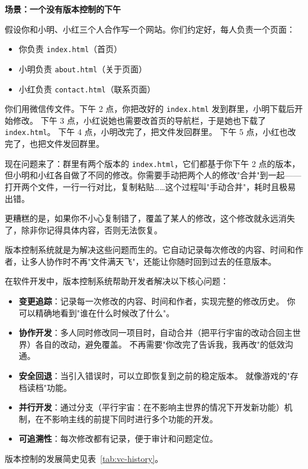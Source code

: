 \documentclass[12pt,a4paper,openany]{ctexbook}
\begin{document}
\medskip
\textbf{场景：一个没有版本控制的下午}

假设你和小明、小红三个人合作写一个网站。你们约定好，每人负责一个页面：
\begin{itemize}
  \item 你负责 \texttt{index.html}（首页）
  \item 小明负责 \texttt{about.html}（关于页面）
  \item 小红负责 \texttt{contact.html}（联系页面）
\end{itemize}

你们用微信传文件。下午 2 点，你把改好的 \texttt{index.html} 发到群里，小明下载后开始修改。
下午 3 点，小红说她也需要改首页的导航栏，于是她也下载了 \texttt{index.html}。
下午 4 点，小明改完了，把文件发回群里。
下午 5 点，小红也改完了，也把文件发回群里。

现在问题来了：群里有两个版本的 \texttt{index.html}，它们都基于你下午 2 点的版本，但小明和小红各自做了不同的修改。你需要手动把两个人的修改"合并"到一起——打开两个文件，一行一行对比，复制粘贴……这个过程叫"手动合并"，耗时且极易出错。

更糟糕的是，如果你不小心复制错了，覆盖了某人的修改，这个修改就永远消失了，除非你记得具体内容，否则无法恢复。

版本控制系统就是为解决这些问题而生的。它自动记录每次修改的内容、时间和作者，让多人协作时不再"文件满天飞"，还能让你随时回到过去的任意版本。
\medskip

在软件开发中，版本控制系统帮助开发者解决以下核心问题：

\begin{itemize}[leftmargin=2em]
  \item \textbf{变更追踪}：记录每一次修改的内容、时间和作者，实现完整的修改历史。
        你可以精确地看到"谁在什么时候改了什么"。
  \item \textbf{协作开发}：多人同时修改同一项目时，自动合并（把平行宇宙的改动合回主世界）各自的改动，避免覆盖。
        不再需要"你改完了告诉我，我再改"的低效沟通。
  \item \textbf{安全回退}：当引入错误时，可以立即恢复到之前的稳定版本。
        就像游戏的"存档读档"功能。
  \item \textbf{并行开发}：通过分支（平行宇宙：在不影响主世界的情况下开发新功能）机制，在不影响主线的前提下同时进行多个功能的开发。
  \item \textbf{可追溯性}：每次修改都有记录，便于审计和问题定位。
\end{itemize}

版本控制的发展简史见表~\ref{tab:vc-history}。
\end{document}
